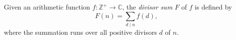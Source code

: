\documentclass[12pt]{article}
\theoremstyle{plain}
\begin{document}
Given an arithmetic function $f:\mathbb{Z}^+\rightarrow\mathbb{C}$, the \emph{divisor sum} $F$ of $f$ is defined by
\begin{equation}
F(n)=\sum\limits_{d\mid n}f(d)\text{,}
\end{equation}
where the summation runs over all positive divisors $d$ of $n$. 

\end{document}
